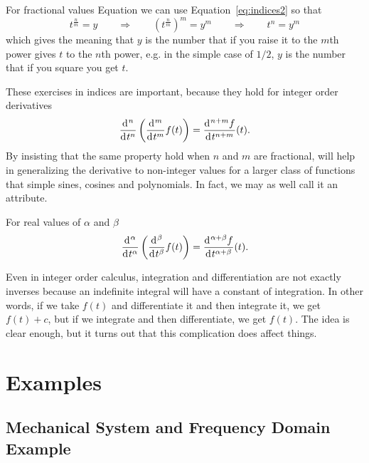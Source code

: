 For fractional values Equation we can use Equation~\ref{eq:indices2} so that
\begin{equation}
  t^\frac{n}{m} = y \qquad \Longrightarrow \qquad \left( t^\frac{n}{m} \right)^m = y^m \qquad \Longrightarrow \qquad t^n = y^m
\end{equation}
which gives the meaning that $y$ is the number that if you raise it to the $m$th power gives $t$ to the $n$th power, e.g. in the simple case of $1/2$, $y$ is the number that if you square you get $t$.

These exercises in indices are important, because they hold for integer order derivatives
\begin{equation}
  \frac{\operatorname{d}\hspace*{-1pt}^n}{\operatorname{d}\hspace*{-1pt} t^n} \left( \frac{\operatorname{d}\hspace*{-1pt}^m}{\operatorname{d}\hspace*{-1pt} t^m} f(t) \right) = \frac{\operatorname{d}\hspace*{-1pt}^{n+m} f}{\operatorname{d}\hspace*{-1pt} t^{n+m}}(t).
\end{equation}
By insisting that the same property hold when $n$ and $m$ are fractional, will help in generalizing the derivative to non-integer values for a larger class of functions that simple sines, cosines and polynomials. In fact, we may as well call it an attribute.

\begin{attribute}
  For real values of $\alpha$ and $\beta$
  \begin{equation}
    \frac{\operatorname{d}\hspace*{-1pt}^\alpha}{\operatorname{d}\hspace*{-1pt} t^\alpha} \left( \frac{\operatorname{d}\hspace*{-1pt}^\beta}{\operatorname{d}\hspace*{-1pt} t^\beta} f(t) \right) = \frac{\operatorname{d}\hspace*{-1pt}^{\alpha + \beta} f}{\operatorname{d}\hspace*{-1pt} t^{\alpha + \beta}}(t).
    \label{eq:derivindices}
  \end{equation}
\end{attribute}

Even in integer order calculus, integration and differentiation are not exactly inverses because an indefinite integral will have a constant of integration. In other words, if we take $f(t)$ and differentiate it and then integrate it, we get $f(t) + c$, but if we integrate and then differentiate, we get $f(t)$. The idea is clear enough, but it turns out that this complication does affect things.


\section{Examples}

\subsection{Mechanical System and Frequency Domain Example}
\label{sec:introexamples}

